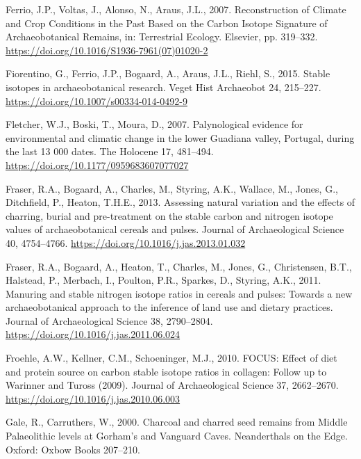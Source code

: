 \documentclass[preprint, 3p, authoryear]{elsarticle} %
\newlength{\cslhangindent}
\newlength{\cslentryspacingunit} %
\newenvironment{CSLReferences}[2] %
 {%
  \setlength{\parindent}{0pt}
  \ifodd #1
  \let\oldpar\par
  \def\par{\hangindent=\cslhangindent\oldpar}
  \fi
  \setlength{\parskip}{#2\cslentryspacingunit}
 }%
 {}
\begin{document}
\begin{CSLReferences}{1}{0}
\leavevmode{}%
Ferrio, J.P., Voltas, J., Alonso, N., Araus, J.L., 2007. Reconstruction of {Climate} and {Crop Conditions} in the {Past Based} on the {Carbon Isotope Signature} of {Archaeobotanical Remains}, in: Terrestrial {Ecology}. {Elsevier}, pp. 319--332. \url{https://doi.org/10.1016/S1936-7961(07)01020-2}

\leavevmode{}%
Fiorentino, G., Ferrio, J.P., Bogaard, A., Araus, J.L., Riehl, S., 2015. Stable isotopes in archaeobotanical research. Veget Hist Archaeobot 24, 215--227. \url{https://doi.org/10.1007/s00334-014-0492-9}

\leavevmode{}%
Fletcher, W.J., Boski, T., Moura, D., 2007. Palynological evidence for environmental and climatic change in the lower {Guadiana} valley, {Portugal}, during the last 13 000 dates. The Holocene 17, 481--494. \url{https://doi.org/10.1177/0959683607077027}

\leavevmode{}%
Fraser, R.A., Bogaard, A., Charles, M., Styring, A.K., Wallace, M., Jones, G., Ditchfield, P., Heaton, T.H.E., 2013. Assessing natural variation and the effects of charring, burial and pre-treatment on the stable carbon and nitrogen isotope values of archaeobotanical cereals and pulses. Journal of Archaeological Science 40, 4754--4766. \url{https://doi.org/10.1016/j.jas.2013.01.032}

\leavevmode{}%
Fraser, R.A., Bogaard, A., Heaton, T., Charles, M., Jones, G., Christensen, B.T., Halstead, P., Merbach, I., Poulton, P.R., Sparkes, D., Styring, A.K., 2011. Manuring and stable nitrogen isotope ratios in cereals and pulses: Towards a new archaeobotanical approach to the inference of land use and dietary practices. Journal of Archaeological Science 38, 2790--2804. \url{https://doi.org/10.1016/j.jas.2011.06.024}

\leavevmode{}%
Froehle, A.W., Kellner, C.M., Schoeninger, M.J., 2010. {FOCUS}: Effect of diet and protein source on carbon stable isotope ratios in collagen: Follow up to {Warinner} and {Tuross} (2009). Journal of Archaeological Science 37, 2662--2670. \url{https://doi.org/10.1016/j.jas.2010.06.003}

\leavevmode{}%
Gale, R., Carruthers, W., 2000. Charcoal and charred seed remains from {Middle Palaeolithic} levels at {Gorham}'s and {Vanguard Caves}. Neanderthals on the Edge. Oxford: Oxbow Books 207--210.


\end{CSLReferences}
\end{document}
